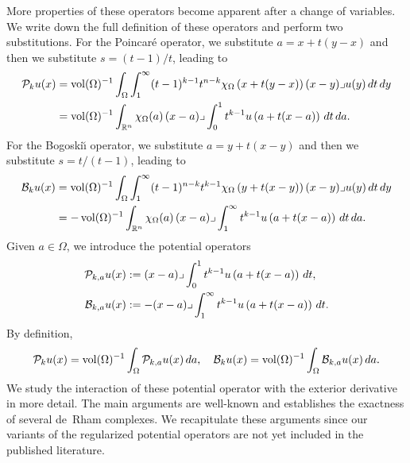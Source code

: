 \documentclass[10pt,a4paper]{article}
\begin{document}
More properties of these operators become apparent after a change of variables. 
We write down the full definition of these operators and perform two substitutions.
For the Poincar\'e operator, we substitute $a = x + t(y-x)$ and then we substitute $s = (t-1)/t$,
leading to 
\begin{align*}
    {\mathcal P}_{k} u(x) 
    &= 
    \operatorname{vol}(\Omega)^{-1}
    \int_{\Omega} \int_{1}^\infty (t-1)^{k-1}t^{n-k} 
    \chi_{\Omega}\left(x+t(y-x)\right) 
    (x-y)\lrcorner u(y) \,dt\,dy 
    \\
    &=
    \operatorname{vol}(\Omega)^{-1}
    \int_{{\mathbb R}^{n}} \chi_{\Omega}(a) \,(x-a)\lrcorner \int_{0}^{1} t^{k-1} u\left(a+t(x-a)\right)\,dt\,da
    .
\end{align*}
For the Bogoski\u{\i} operator, we substitute $a = y + t(x-y)$ and then we substitute $s = t/(t-1)$,
leading to 
\begin{align*}
    {\mathcal B}_{k} u(x) 
    &= 
    \operatorname{vol}(\Omega)^{-1}
    \int_{\Omega} \int_{1}^\infty (t-1)^{n-k}t^{k-1} 
    \chi_{\Omega}\left(y+t(x-y)\right) 
    (x-y)\lrcorner u(y) \,dt\,dy 
    \\
    &=
    - 
    \operatorname{vol}(\Omega)^{-1}
    \int_{{\mathbb R}^{n}} \chi_{\Omega}(a) \,(x-a)\lrcorner \int_{1}^\infty t^{k-1} u\left(a+t(x-a)\right)\,dt\,da
    .
\end{align*}
% 
Given $a \in \Omega$, we introduce the potential operators 
\begin{align*}
    {\mathcal P}_{k,a} u(x) 
    &:= 
    (x-a)\lrcorner \int_{0}^{1} t^{k-1} u\left(a+t(x-a)\right)\,dt
    ,
    \\
    {\mathcal B}_{k,a} u(x) 
    &:= 
    - (x-a)\lrcorner \int_{1}^\infty t^{k-1} u\left(a+t(x-a)\right)\,dt
    .
\end{align*}
By definition,
\begin{align*}
    {\mathcal P}_{k} u(x) 
    =
    \operatorname{vol}(\Omega)^{-1}
    \int_{\Omega} {\mathcal P}_{k,a} u(x) \,da,
    \quad 
    {\mathcal B}_{k} u(x) 
    =
    \operatorname{vol}(\Omega)^{-1}
    \int_{\Omega} {\mathcal B}_{k,a} u(x) \,da
    .
\end{align*}
We study the interaction of these potential operator with the exterior derivative in more detail.
% 
The main arguments are well-known and establishes the exactness of several de~Rham complexes. 
We recapitulate these arguments since our variants of the regularized potential operators are not yet included in the published literature. 
\end{document}
